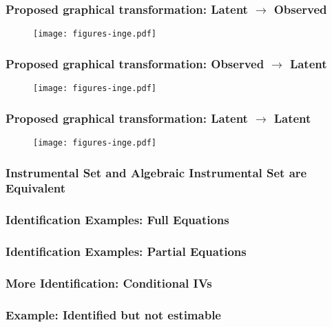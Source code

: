 \documentclass{beamer}
\begin{document}
\begin{frame}
	\frametitle{Proposed graphical transformation: Latent $ \rightarrow $ Observed}
	\begin{figure}
		\centering
		\texttt{[image: figures-inge.pdf]}
		\caption{}
		\label{fig:l2o_parent}
	\end{figure}
\end{frame}
\begin{frame}
	\frametitle{Proposed graphical transformation: Observed $ \rightarrow $ Latent}
	\begin{figure}
		\centering
		\texttt{[image: figures-inge.pdf]}
		\caption{}
		\label{fig:l2o_child}
	\end{figure}
\end{frame}
\begin{frame}
	\frametitle{Proposed graphical transformation: Latent $ \rightarrow $ Latent}
	\begin{figure}
		\centering
		\texttt{[image: figures-inge.pdf]}
		\caption{}
		\label{fig:l2o_both}
	\end{figure}
\end{frame}

\begin{frame}
	\frametitle{Instrumental Set and Algebraic Instrumental Set are Equivalent}
\end{frame}

\begin{frame}
	\frametitle{Identification Examples: Full Equations}
\end{frame}

\begin{frame}
	\frametitle{Identification Examples: Partial Equations}
\end{frame}

\begin{frame}
	\frametitle{More Identification: Conditional IVs}
\end{frame}

\begin{frame}
	\frametitle{Example: Identified but not estimable}
\end{frame}
\end{document}
